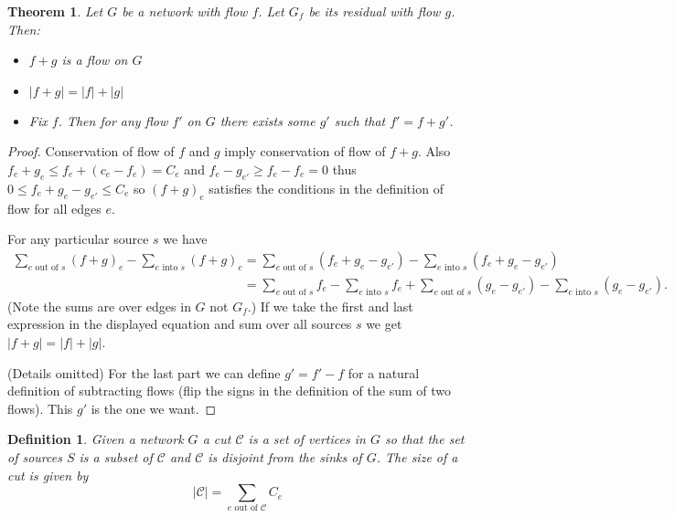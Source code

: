 \documentclass[12pt]{article}
\newtheorem{Definition}{Definition}
\newtheorem{Theorem}{Theorem}
\begin{document}
\begin{Theorem}
    Let $G$ be a network with flow $f$. Let $G_f$ be its residual with flow $g$. Then:
    \begin{itemize}
        \item $f+g$ is a flow on $G$
        \item $|f+g| = |f|+|g|$
        \item Fix $f$. Then for any flow $f'$ on $G$ there exists some $g'$ such that $f'=f+g'$.
    \end{itemize}
\end{Theorem}
\begin{proof}
    Conservation of flow of $f$ and $g$ imply conservation of flow of $f+g$. Also $f_e+g_e\leq f_e+(c_e-f_e) = C_e$ and $f_e-g_{e'}\geq f_e-f_e = 0$ thus $0 \leq f_e + g_e-g_{e'}\leq C_e$ so $(f+g)_e$ satisfies the conditions in the definition of flow for all edges $e$.

    For any particular source $s$ we have
    \begin{align*}
        \sum_{e\text{ out of }s}(f+g)_e - \sum_{e\text{ into }s}(f+g)_e
          & = \sum_{e\text{ out of }s}(f_e + g_e - g_{e'}) - \sum_{e\text{ into }s}(f_e+g_e-g_{e'})                                                   \\
          & = \sum_{e\text{ out of }s}f_e - \sum_{e\text{ into }s}f_e +\sum_{e\text{ out of }s}( g_e - g_{e'}) -  \sum_{e\text{ into }s}(g_e-g_{e'}).
    \end{align*}
    (Note the sums are over edges in $G$ not $G_f$.) If we take the first and last expression in the displayed equation and sum over all sources $s$ we get $|f+g| = |f|+|g|$.

    (Details omitted) For the last part we can define $g' = f' - f$ for a natural definition of subtracting flows (flip the signs in the definition of the sum of two flows). This $g'$ is the one we want.
\end{proof}

\begin{Definition}
    Given a network $G$ a cut $\mathcal{C}$ is a set of vertices in $G$ so that the set of sources $S$ is a subset of $\mathcal{C}$ and $\mathcal{C}$ is disjoint from the sinks of $G$. The size of a cut is given by
    \[
        |\mathcal{C}| = \sum_{e \text{ out of }\mathcal{C}}C_e
    \]
\end{Definition}
\end{document}
